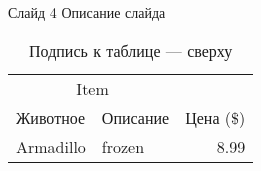 
\begin{frame}{Слайд 4}
	Описание слайда
	\begin{table}[H]
		\centering
		\caption{\label{tab:widgets}Подпись к таблице --- сверху}
		\begin{tabular}{llr}
			\toprule
			        \multicolumn{2}{c}{Item}         &           \\
			\cmidrule(r){1-2}
			Животное & Описание & Цена (\$) \\ \midrule
			Armadillo                     & frozen   &      8.99 \\ \bottomrule
		\end{tabular}
	\end{table}
\end{frame}